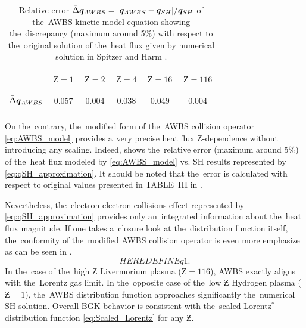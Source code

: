 \begin{table}
\begin{center}
  \begin{tabular}{c|ccccc}
    \hline\hline\\
    & $\,\Zbar=1\,$ & $\,\Zbar=2\,$ & $\,\Zbar=4\,$ & $\,\Zbar=16\,$ & $\,\Zbar=116\,$ \\\\
    \hline\\
    $\bar{\Delta}\boldsymbol{q}_{AWBS}$ & 0.057 & 0.004 & 0.038 & 0.049 & 0.004 \\\\
    \hline\hline
  \end{tabular}
  \caption{
  Relative error $\bar{\Delta}\boldsymbol{q}_{AWBS} = 
  |\boldsymbol{q}_{AWBS} - \boldsymbol{q}_{SH}| / \boldsymbol{q}_{SH}$ of the~AWBS
  kinetic model equation  showing the~discrepancy 
  (maximum around 5$\%$) with respect to the~original solution of 
  the~heat flux given by numerical solution in Spitzer and Harm 
  \cite{SpitzerHarm_PR1953}.
  }
\label{tab:qAWBS}
\end{center}
\end{table}

On the~contrary, the~modified form of the~AWBS collision operator 
\eqref{eq:AWBS_model} provides a~very precise heat flux $\Zbar$-dependence
without introducing any scaling. Indeed,  shows the~relative
error (maximum around 5$\%$) of the~heat flux modeled by 
\eqref{eq:AWBS_model} vs. SH results represented by 
\eqref{eq:qSH_approximation}. It should be noted that the~error is calculated 
with respect to original values presented in TABLE~III in 
\cite{SpitzerHarm_PR1953}.

Nevertheless, the~electron-electron collisions effect represented by 
\eqref{eq:qSH_approximation} provides only an~integrated information about
the~heat flux magnitude. If one takes a~closure look at the~distribution
function itself, the~conformity of the~modified AWBS collision operator
is even more emphasize as can be seen in .
\begin{equation}
  HERE DEFINE q1.
  \nonumber
\end{equation}
In the~case of the~high $\Zbar$ Livermorium plasma ($\Zbar = 116$), 
AWBS exactly aligns with the~Lorentz gas limit. In the~opposite case of the~low
$\Zbar$ Hydrogen plasma ($\Zbar = 1$), the~AWBS distribution function 
approaches significantly the~numerical SH solution. Overall BGK behavior is 
consistent with the~scaled Lorentz$^*$ distribution function 
\eqref{eq:Scaled_Lorentz} for any $\Zbar$.  


